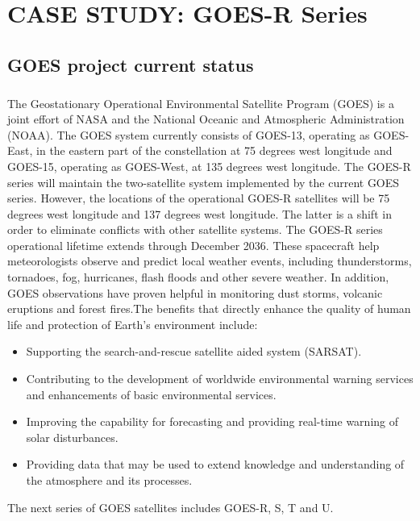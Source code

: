 \chapter{\normalsize{CASE STUDY: GOES-R Series}}
\section{GOES project current status}
\paragraph{}
The Geostationary Operational Environmental Satellite Program (GOES) is a joint effort of NASA and the National Oceanic and Atmospheric Administration (NOAA). The GOES system currently consists of GOES-13, operating as GOES-East, in the eastern part of the constellation at 75 degrees west longitude and GOES-15, operating as GOES-West, at 135 degrees west longitude. The GOES-R series will maintain the two-satellite system implemented by the current GOES series. However, the locations of the operational GOES-R satellites will be 75 degrees west longitude and 137 degrees west longitude. The latter is a shift in order to eliminate conflicts with other satellite systems. The GOES-R series operational lifetime extends through December 2036.
These spacecraft help meteorologists observe and predict local weather events, including thunderstorms, tornadoes, fog, hurricanes, flash floods and other severe weather. In addition, GOES observations have proven helpful in monitoring dust storms, volcanic eruptions and forest fires.The benefits that directly enhance the quality of human life and protection of Earth's environment include:
\begin{itemize} 
\item Supporting the search-and-rescue satellite aided system (SARSAT).
\item Contributing to the development of worldwide environmental warning services and enhancements of basic environmental services.
\item Improving the capability for forecasting and providing real-time warning of solar disturbances.
\item Providing data that may be used to extend knowledge and understanding of the atmosphere and its processes.
\end{itemize}	
The next series of GOES satellites includes GOES-R, S, T and U.
\newpage
